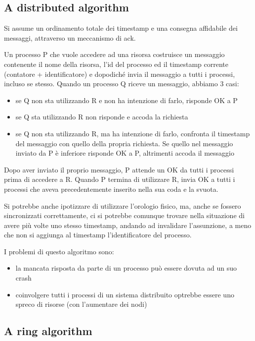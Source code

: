 \subsection{A distributed algorithm}

Si assume un ordinamento totale dei timestamp e una consegna affidabile dei messaggi, attraverso un meccanismo di ack. 

Un processo P che vuole accedere ad una risorsa costruisce un messaggio contenente il nome della risorsa, l'id del processo ed il timestamp corrente (contatore + identificatore) e dopodiché invia il messaggio a tutti i processi, incluso se stesso.  Quando un processo Q riceve un messaggio, abbiamo 3 casi:

\begin{itemize}
    \item se Q non sta utilizzando R e non ha intenzione di farlo, risponde OK a P
    \item se Q sta utilizzando R non risponde e accoda la richiesta
    \item se Q non sta utilizzando R, ma ha intenzione di farlo, confronta il timestamp del messaggio con quello della propria richiesta. Se quello nel messaggio inviato da P è inferiore risponde OK a P, altrimenti accoda il messaggio
\end{itemize}

Dopo aver inviato il proprio messaggio, P attende un OK da tutti i processi prima di accedere a R. Quando P termina di utilizzare R, invia OK a tutti i processi che aveva precedentemente inserito nella sua coda e la svuota.

Si potrebbe anche ipotizzare di utilizzare l'orologio fisico, ma, anche se fossero sincronizzati correttamente, ci si potrebbe comunque trovare nella situazione di avere più volte uno stesso timestamp, andando ad invalidare l'assunzione, a meno che non si aggiunga al timestamp l'identificatore del processo.

I problemi di questo algoritmo sono:
\begin{itemize}
    \item la mancata risposta da parte di un processo può essere dovuta ad un suo crash
    \item coinvolgere tutti i processi di un sistema distribuito optrebbe essere uno spreco di risorse (con l'aumentare dei nodi)
\end{itemize}

\subsection{A ring algorithm}

